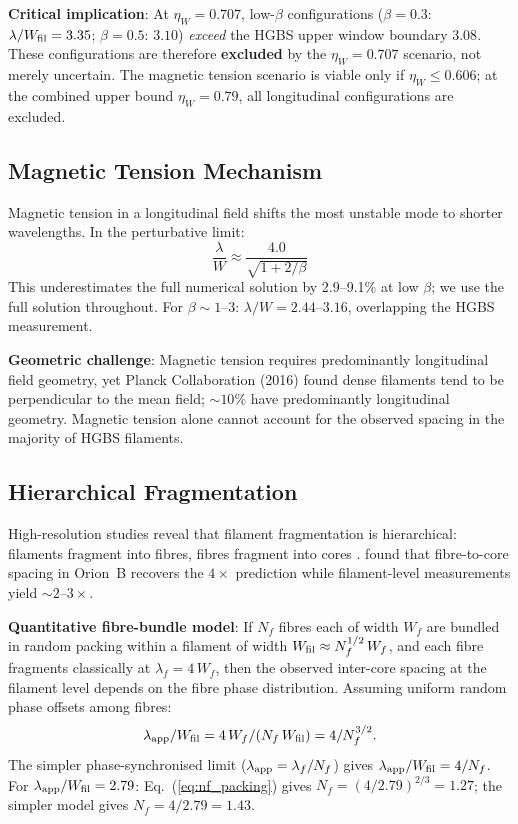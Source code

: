 \documentclass[twoside,twocolumn]{mnras}
\begin{document}
\textbf{Critical implication}: At $\eta_W = 0.707$, low-$\beta$ configurations
($\beta = 0.3$: $\lambda/W_{\rm fil} = 3.35$; $\beta = 0.5$: $3.10$) \textit{exceed}
the HGBS upper window boundary $3.08$. These configurations are therefore
\textbf{excluded} by the $\eta_W = 0.707$ scenario, not merely uncertain. The
magnetic tension scenario is viable only if $\eta_W \leq 0.606$; at the combined
upper bound $\eta_W = 0.79$, all longitudinal configurations are excluded.

\subsection{Magnetic Tension Mechanism}

Magnetic tension in a longitudinal field \citep{Nakamura1993} shifts the most unstable
mode to shorter wavelengths. In the perturbative limit:
\begin{equation}
\frac{\lambda}{W} \approx \frac{4.0}{\sqrt{1 + 2/\beta}}
\label{eq:tension}
\end{equation}
This underestimates the full numerical solution by 2.9--9.1\% at low $\beta$; we use
the full solution throughout. For $\beta \sim 1$--$3$: $\lambda/W = 2.44$--$3.16$,
overlapping the HGBS measurement.

\textbf{Geometric challenge}: Magnetic tension requires predominantly longitudinal field
geometry, yet Planck Collaboration (2016) found dense filaments tend to be perpendicular
to the mean field; ${\sim}10\%$ have predominantly longitudinal geometry. Magnetic tension
alone cannot account for the observed spacing in the majority of HGBS filaments.

\subsection{Hierarchical Fragmentation}
\label{sec:hierarchical}

High-resolution studies reveal that filament fragmentation is hierarchical: filaments
fragment into fibres, fibres fragment into cores \citep{Hacar2013, Hacar2018}.
\citet{Yang2024} found that fibre-to-core spacing in Orion~B recovers the $4\times$
prediction while filament-level measurements yield ${\sim}2$--$3\times$.

\textbf{Quantitative fibre-bundle model}: If $N_f$ fibres each of width $W_f$ are
bundled in random packing within a filament of width $W_{\rm fil} \approx N_f^{1/2}\,W_f$,
and each fibre fragments classically at $\lambda_f = 4\,W_f$, then the
observed inter-core spacing at the filament level depends on the fibre phase
distribution. Assuming uniform random phase offsets among fibres:
\begin{equation}
\lambda_{\rm app}/W_{\rm fil} = 4\,W_f/(N_f\,W_{\rm fil}) = 4/N_f^{3/2}.
\label{eq:nf_packing}
\end{equation}
The simpler phase-synchronised limit ($\lambda_{\rm app} = \lambda_f/N_f$) gives
$\lambda_{\rm app}/W_{\rm fil} = 4/N_f$.
For $\lambda_{\rm app}/W_{\rm fil} = 2.79$: Eq.~(\ref{eq:nf_packing}) gives
$N_f = (4/2.79)^{2/3} = 1.27$; the simpler model gives $N_f = 4/2.79 = 1.43$.
\end{document}

